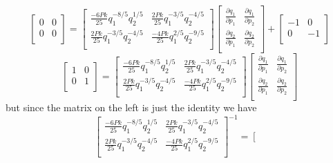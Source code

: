 \documentclass[12pt]{article}
\begin{document}
\begin{enumerate}
\[
\left[
\begin{array}{lr}
0&0 \\ 
0&0\\
\end{array}
\right] =
\left[ \begin{array}{lr} \frac{-6 P k}{25} q_1^{-8/5} q_2^{1/5} & \frac{2 P k}{25} q_1^{-3/5}q_2^{-4/5}\\  \frac{2 P k}{25} q_1^{-3/5} q_2^{-4/5} & \frac{-4 P k}{25} q_1^{2/5}q_2^{-9/5}\\   \end{array} \right] 
\left[
\begin{array}{lr}
\frac{\partial q_1}{\partial p_1} & \frac{\partial q_1}{\partial p_2} \\ 
\frac{\partial q_2}{\partial p_1} & \frac{\partial q_2}{\partial p_2} \\
\end{array}
\right]
+\left[
\begin{array}{lr}
-1 & 0\\ 
0 &-1 \\
\end{array}
\right]
\]
\[
\left[
\begin{array}{lr}
1 & 0\\ 
0 &1 \\
\end{array}
\right]
=
\left[ \begin{array}{lr} \frac{-6 P k}{25} q_1^{-8/5} q_2^{1/5} & \frac{2 P k}{25} q_1^{-3/5}q_2^{-4/5}\\  \frac{2 P k}{25} q_1^{-3/5} q_2^{-4/5} & \frac{-4 P k}{25} q_1^{2/5}q_2^{-9/5}\\   \end{array} \right] 
\left[
\begin{array}{lr}
\frac{\partial q_1}{\partial p_1} & \frac{\partial q_1}{\partial p_2} \\ 
\frac{\partial q_2}{\partial p_1} & \frac{\partial q_2}{\partial p_2} \\
\end{array}
\right]
\]
but since the matrix on the left is just the identity we have 
\[
\left[ \begin{array}{lr} \frac{-6 P k}{25} q_1^{-8/5} q_2^{1/5} & \frac{2 P k}{25} q_1^{-3/5}q_2^{-4/5}\\  \frac{2 P k}{25} q_1^{-3/5} q_2^{-4/5} & \frac{-4 P k}{25} q_1^{2/5}q_2^{-9/5}\\   \end{array} \right] ^{-1}
=
\left[
\begin{array}{lr}

\end{array}\]
\end{enumerate}
\end{document}

